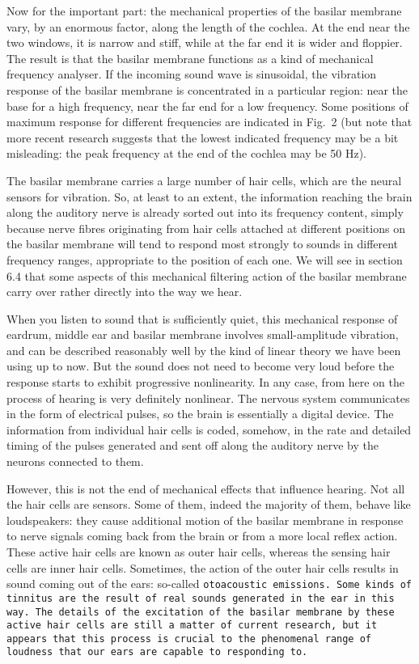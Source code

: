   Now for the important part: the mechanical properties of the basilar membrane 
  vary, by an enormous factor, along the length of the cochlea. At the end near 
  the two windows, it is narrow and stiff, while at the far end it is wider and 
  floppier. The result is that the basilar membrane functions as a kind of 
  mechanical frequency analyser. If the incoming sound wave is sinusoidal, the 
  vibration response of the basilar membrane is concentrated in a particular 
  region: near the base for a high frequency, near the far end for a low 
  frequency. Some positions of maximum response for different frequencies are 
  indicated in Fig.\ 2 (but note that more recent research suggests that the 
  lowest indicated frequency may be a bit misleading: the peak frequency at the 
  end of the cochlea may be 50 Hz). 

  The basilar membrane carries a large number of hair cells, which are the 
  neural sensors for vibration. So, at least to an extent, the information 
  reaching the brain along the auditory nerve is already sorted out into its 
  frequency content, simply because nerve fibres originating from hair cells 
  attached at different positions on the basilar membrane will tend to respond 
  most strongly to sounds in different frequency ranges, appropriate to the 
  position of each one. We will see in section 6.4 that some aspects of this 
  mechanical filtering action of the basilar membrane carry over rather 
  directly into the way we hear. 

  When you listen to sound that is sufficiently quiet, this mechanical response 
  of eardrum, middle ear and basilar membrane involves small-amplitude 
  vibration, and can be described reasonably well by the kind of linear theory 
  we have been using up to now. But the sound does not need to become very loud 
  before the response starts to exhibit progressive nonlinearity. In any case, 
  from here on the process of hearing is very definitely nonlinear. The nervous 
  system communicates in the form of electrical pulses, so the brain is 
  essentially a digital device. The information from individual hair cells is 
  coded, somehow, in the rate and detailed timing of the pulses generated and 
  sent off along the auditory nerve by the neurons connected to them. 

  However, this is not the end of mechanical effects that influence hearing. 
  Not all the hair cells are sensors. Some of them, indeed the majority of 
  them, behave like loudspeakers: they cause additional motion of the basilar 
  membrane in response to nerve signals coming back from the brain or from a 
  more local reflex action. These active hair cells are known as outer hair 
  cells, whereas the sensing hair cells are inner hair cells. Sometimes, the 
  action of the outer hair cells results in sound coming out of the ears: 
  so-called \tt{}otoacoustic emissions\rm{}. Some kinds of tinnitus are the 
  result of real sounds generated in the ear in this way. The details of the 
  excitation of the basilar membrane by these active hair cells are still a 
  matter of current research, but it appears that this process is crucial to 
  the phenomenal range of loudness that our ears are capable to responding to. 

